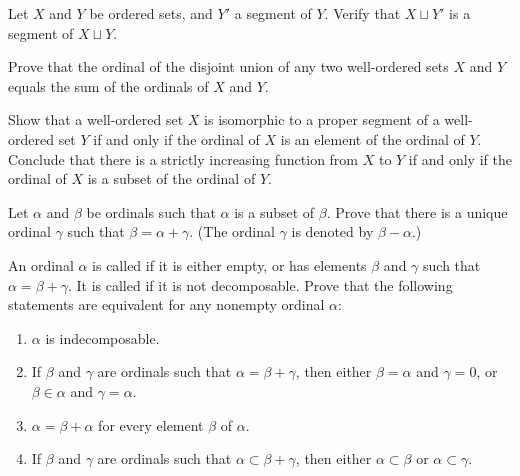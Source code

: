 \documentclass{article}
\begin{document}
\begin{exercise}
  \label{exe:5b354opw}
  Let \(X\) and \(Y\) be ordered sets, and \(Y'\) a segment of \(Y\).
  Verify that \(X \sqcup Y'\) is a segment of \(X \sqcup Y\).
\end{exercise}

\begin{exercise}
  \label{exe:747n2vsf}
  Prove that the ordinal of the disjoint union of any two well-ordered
  sets \(X\) and \(Y\) equals the sum of the ordinals of \(X\) and
  \(Y\).
\end{exercise}

\begin{exercise}
  \label{exe:azb90ixm}
  Show that a well-ordered set \(X\) is isomorphic to a proper segment
  of a well-ordered set \(Y\) if and only if the ordinal of \(X\) is
  an element of the ordinal of \(Y\).  Conclude that there is a
  strictly increasing function from \(X\) to \(Y\) if and only if the
  ordinal of \(X\) is a subset of the ordinal of \(Y\).
\end{exercise}

\begin{exercise}
  \label{exe:ag2uw6ck}
  Let \(\alpha\) and \(\beta\) be ordinals such that \(\alpha\) is a
  subset of \(\beta\).  Prove that there is a unique ordinal
  \(\gamma\) such that \(\beta = \alpha + \gamma\).  (The ordinal
  \(\gamma\) is denoted by \(\beta - \alpha\).)
\end{exercise}

\begin{exercise}
  \label{exe:nu1k66wl}
  An ordinal \(\alpha\) is called  if it is
  either empty, or has elements \(\beta\) and \(\gamma\) such that
  \(\alpha = \beta + \gamma\).  It is called
   if it is not decomposable.  Prove that
  the following statements are equivalent for any nonempty ordinal
  \(\alpha\):
  \begin{enumerate}
  \item \(\alpha\) is indecomposable.
  \item If \(\beta\) and \(\gamma\) are ordinals such that
    \(\alpha = \beta + \gamma\), then either \(\beta = \alpha\) and
    \(\gamma = 0\), or \(\beta \in \alpha\) and \(\gamma = \alpha\).
  \item \(\alpha = \beta + \alpha\) for every element \(\beta\) of
    \(\alpha\).
  \item If \(\beta\) and \(\gamma\) are ordinals such that
    \(\alpha \subset \beta + \gamma\), then either
    \(\alpha \subset \beta\) or \(\alpha \subset \gamma\).
  \end{enumerate}
\end{exercise}
\end{document}
